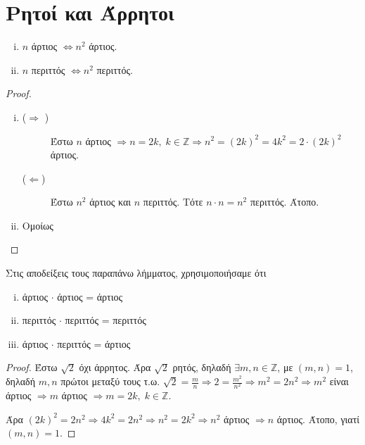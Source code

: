 \documentclass[main.tex]{subfiles}
\begin{document}
\section{Ρητοί και Άρρητοι}

\begin{lem}
\item {}
  \begin{enumerate}[(i)]
    \item $n$ άρτιος $ \Leftrightarrow n^{2} $ άρτιος.
    \item $ n $ περιττός $ \Leftrightarrow n^{2} $ περιττός.
  \end{enumerate}
\end{lem}

\begin{proof}
\item {}
  \begin{enumerate}[(i)]
    \item 
      \begin{description}
        \item [($ \Rightarrow $ )] 
          Έστω $ n $ άρτιος $ \Rightarrow n =2k, \; k \in \mathbb{Z} 
          \Rightarrow n^{2} = (2k)^{2} = 4k^{2} = 2\cdot (2k)^{2} $ άρτιος. 
        \item [($ \Leftarrow $)] Έστω $ n^{2} $ άρτιος και $n$ περιττός. Τότε 
          $ n \cdot n = n^{2} $ περιττός. Άτοπο.
      \end{description}

    \item Ομοίως
  \end{enumerate}
\end{proof}

\begin{rem}
  Στις αποδείξεις τους παραπάνω λήμματος, χρησιμοποιήσαμε ότι 
  \begin{enumerate}[(i)]
    \item άρτιος $ \cdot $ άρτιος = άρτιος
    \item περιττός $ \cdot $ περιττός = περιττός
    \item άρτιος $ \cdot $ περιττός = άρτιος
  \end{enumerate}
\end{rem}


\begin{proof}
  Έστω $ \sqrt{2} $ όχι άρρητος. Άρα $ \sqrt{2} $ ρητός, δηλαδή $ \exists m,n 
  \in \mathbb{Z} $, με $ (m,n)=1 $, δηλαδή $ m,n $ πρώτοι μεταξύ τους
  τ.ω. $ \sqrt{2} = \frac{m}{n} \Rightarrow 2 = \frac{m^{2}}{n^{2}} \Rightarrow 
  m^{2} = 2n^{2} \Rightarrow m^{2}$ είναι άρτιος $ \Rightarrow m $ άρτιος 
  $ \Rightarrow m = 2k, \; k \in \mathbb{Z}$. 

  Άρα $ (2k)^{2} = 2n^{2} \Rightarrow 4k^{2}=2n^{2} \Rightarrow n^{2} = 2k^{2} 
  \Rightarrow n^{2} $ άρτιος $ \Rightarrow n $ άρτιος. Άτοπο, γιατί $ (m,n)=1 $.
\end{proof}
\end{document}

